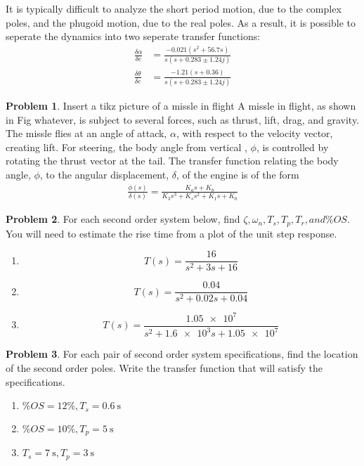 \documentclass[10pt]{article}
\theoremstyle{definition}
\newtheorem{prob}{Problem}[section]
\newenvironment{subprob}%
{\renewcommand{\theenumi}{\alph{enumi}}\renewcommand{\labelenumi}{(\theenumi)}\begin{enumerate}}%
{\end{enumerate}}%
\begin{document}
It is typically difficult to analyze the short period motion, due to the complex poles, and the phugoid motion, due to the real poles. 
As a result, it is possible to seperate the dynamics into two seperate transfer functions:
\begin{align}
    \frac{\delta \alpha}{\delta e} &= \frac{-0.021 (s^2 + 56.7 s)}{s(s+0.283 \pm 1.24 j)} \\
    \frac{\delta \theta}{\delta e} &= \frac{-1.21 (s + 0.36)}{s(s+0.283 \pm 1.24 j)}
\end{align}

\begin{prob}
    Insert a tikz picture of a missle in flight
    A missle in flight, as shown in Fig whatever, is subject to several forces, such as thrust, lift, drag, and gravity. 
    The missle flies at an angle of attack, \( \alpha \), with respect to the velocity vector, creating lift.
    For steering, the body angle from vertical , \( \phi\), is controlled by rotating the thrust vector at the tail.
    The transfer function relating the body angle, \( \phi\), to the angular displacement, \( \delta \), of the engine is of the form
    \begin{align}
        \frac{\phi(s)}{\delta (s)} = \frac{K_a s + K_b}{K_3 s^3 + K_s s^2 + K_1 s + K_0}
    \end{align}
\end{prob}

\begin{prob}
    For each second order system below, find \( \zeta , \omega_n, T_s, T_p, T_r, and \% OS\).
    You will need to estimate the rise time from a plot of the unit step response.
    \begin{subprob}
        \item \[ T(s) = \frac{16}{s^2 + 3s + 16}\]
        \item \[ T(s) = \frac{0.04}{s^2 + 0.02 s + 0.04}\]
        \item \[ T(s) = \frac{\num{1.05e7}}{s^2 + \num{1.6e3}s + \num{1.05e7}}\]
    \end{subprob}
\end{prob}

\begin{prob}
    For each pair of second order system specifications, find the location of the second order poles.
    Write the transfer function that will satisfy the specifications.
    \begin{subprob}
        \item \( \% OS = 12 \%, T_s = \SI{0.6}{\second}\)
        \item \( \% OS = 10 \%, T_p = \SI{5}{\second}\)
        \item \( T_s = \SI{7}{\second}, T_p = \SI{3}{\second}\)
    \end{subprob}
\end{prob}
\end{document}
